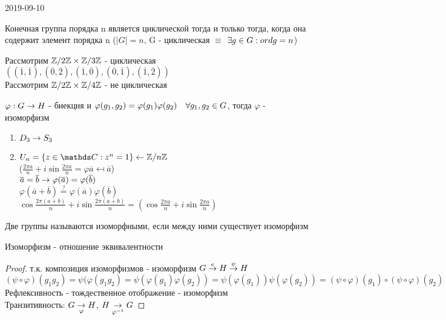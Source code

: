 \documentclass[main, 12pt, fleqn]{subfiles}
\begin{document}
\begin{lect} {2019-09-10}
\begin{definition}
    Конечная группа порядка n является циклической тогда и только тогда, когда она содержит элемент порядка n ($|G|=n$, G - циклическая $\equiv$ $\exists g \in G: ord g = n$)
\end{definition}
Рассмотрим $\mathbb{Z} /2 \mathbb{Z} \times \mathbb{Z} /3 \mathbb{Z}$ - циклическая\\
$((\overline{1},\overline{1}), (\overline{0}, \overline{2}), (\overline{1}, \overline{0}), (\overline{0}, \overline{1}), (\overline{1},\overline{2}))$\\
Рассмотрим $\mathbb{Z} /2 \mathbb{Z} \times \mathbb{Z} /4 \mathbb{Z}$ - не циклическая

\begin{definition}
    $\varphi: G \rightarrow H$ - биекция и $\varphi(g_1,g_2)=\varphi(g_1) \varphi(g_2)\quad \forall g_1,g_2 \in G$, тогда $\varphi$ - изоморфизм 
\end{definition}

\begin{examples}
    \begin{enumerate}
        \item $D_3 \rightarrow S_3$
        \item $U_n=\{z\in \CC: z^n=1\} \la \Z / n \Z$\\
        ($\frac{2\pi a}{n}+i \sin \frac{2\pi a}{n} = \varphi \overline{a} \mapsfrom \overline{a}$)\\
        $\overline{a}=\overline{b} \rightarrow \varphi(\overline{a})=\varphi(\overline{b})$\\
        $\varphi(\overline{a}+\overline{b}) \overset{?}{=} \varphi(\overline{a})\varphi(\overline{b})$\\
        $\cos \frac{2\pi(a+b)}{n}+i \sin \frac{2\pi(a+b)}{n}=(\cos\frac{2\pi a}{n} + i \sin \frac{2\pi a}{n}) $
    \end{enumerate}
\end{examples}

\begin{definition}
    Две группы называются изоморфными, если между ними существует изоморфизм
\end{definition}

\begin{utv}
    Изоморфизм - отношение эквивалентности
\end{utv}

\begin{proof} 
    т.к. композиция изоморфизмов - изоморфизм $G \overset{e}{\rightarrow} H \overset{\psi}{\rightarrow} H$\\
    $(\psi \circ \varphi)(g_1 g_2)= \psi(\varphi(g_1 g_2)=\psi(\varphi(g_1) \varphi(g_2))=\psi(\varphi(g_1)) \psi(\varphi(g_2)) = (\psi \circ \varphi)(g_1) \circ (\psi \circ \varphi)(g_2)$\\
    Рефлексивность - тождественное отображение - изоморфизм\\
    Транзитивность: $G \underset{\varphi}{\rightarrow} H$, $H \underset{\varphi^{-1}}{\rightarrow} G$
\end{proof}


\end{lect}
\end{document}
